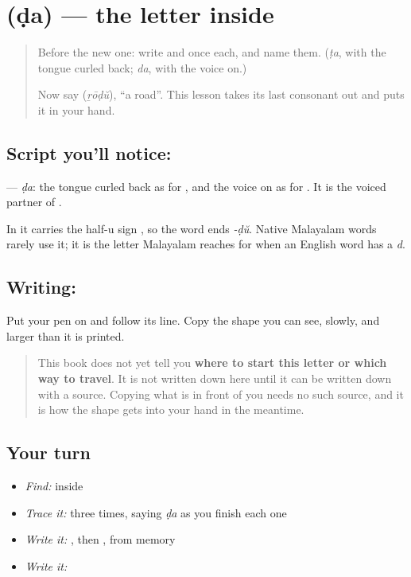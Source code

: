 \section[\texorpdfstring{\ml{ഡ} (ḍa)}{ഡ (ḍa)}]{ (ḍa) — the letter inside }

\label{lesson:ML-W343-da}



\begin{quote}
Before the new one: write \textbf{} and \textbf{} once each, and name them. (\emph{ṭa}, with the tongue curled back; \emph{da}, with the voice on.)

Now say \textbf{} (\emph{ṟōḍŭ}), \textquotedblleft{}a road\textquotedblright{}. This lesson takes its last consonant out and puts it in your hand.
\end{quote}

\subsection*{Script you'll notice: }
\textbf{} — \emph{ḍa}: the tongue curled back as for \textbf{}, and the voice on as for \textbf{}. It is the voiced partner of \textbf{}.

In \textbf{} it carries the half-u sign \textbf{}, so the word ends \emph{-ḍŭ}. Native Malayalam words rarely use it; it is the letter Malayalam reaches for when an English word has a \emph{d}.

\subsection*{Writing: }
Put your pen on \textbf{} and follow its line. Copy the shape you can see, slowly, and larger than it is printed.

\begin{quote}
This book does not yet tell you \textbf{where to start this letter or which way to travel}. It is not written down here until it can be written down with a source. Copying what is in front of you needs no such source, and it is how the shape gets into your hand in the meantime.
\end{quote}

\subsection*{Your turn}
\begin{itemize}
\raggedright
  \item \emph{Find:}  inside \textbf{}
  \item \emph{Trace it:}  three times, saying \emph{ḍa} as you finish each one
  \item \emph{Write it:} , then , from memory
  \item \emph{Write it:} \textbf{}
\end{itemize}

